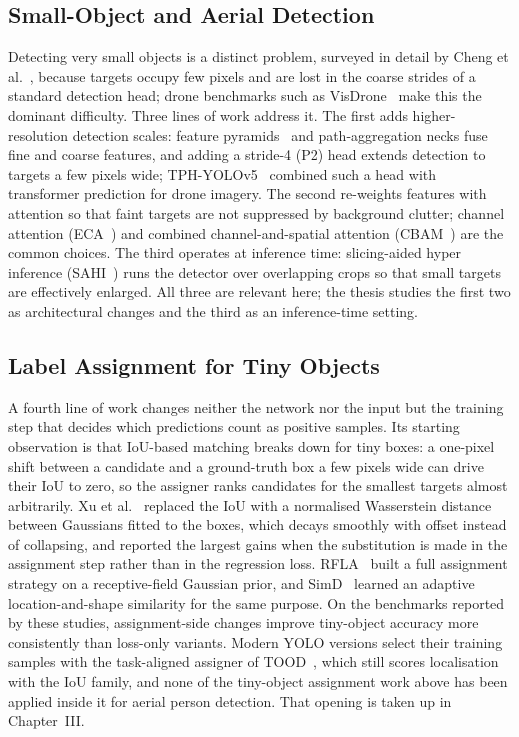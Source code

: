 \subsection{Small-Object and Aerial Detection}
Detecting very small objects is a distinct problem, surveyed in detail by Cheng et
al.~\cite{cheng2023smallobject}, because targets occupy few pixels and are lost in
the coarse strides of a standard detection head; drone benchmarks such as
VisDrone~\cite{zhu2021visdrone} make this the dominant difficulty. Three lines of
work address it. The first adds higher-resolution detection scales: feature
pyramids~\cite{lin2017fpn} and path-aggregation necks fuse fine and coarse features,
and adding a stride-4 (P2) head extends detection to targets a few pixels wide;
TPH-YOLOv5~\cite{zhu2021tphyolov5} combined such a head with transformer prediction
for drone imagery. The second re-weights features with attention so that faint
targets are not suppressed by background clutter; channel attention
(ECA~\cite{wang2020eca}) and combined channel-and-spatial attention
(CBAM~\cite{woo2018cbam}) are the common choices. The third operates at inference
time: slicing-aided hyper inference (SAHI~\cite{akyon2022sahi}) runs the detector
over overlapping crops so that small targets are effectively enlarged. All three are
relevant here; the thesis studies the first two as architectural changes and the
third as an inference-time setting.

\subsection{Label Assignment for Tiny Objects}
A fourth line of work changes neither the network nor the input but the
training step that decides which predictions count as positive samples. Its
starting observation is that IoU-based matching breaks down for tiny boxes: a
one-pixel shift between a candidate and a ground-truth box a few pixels wide
can drive their IoU to zero, so the assigner ranks candidates for the smallest
targets almost arbitrarily. Xu et al.~\cite{xu2022nwdrka} replaced the IoU
with a normalised Wasserstein distance between Gaussians fitted to the boxes,
which decays smoothly with offset instead of collapsing, and reported the
largest gains when the substitution is made in the assignment step rather than
in the regression loss. RFLA~\cite{xu2022rfla} built a full assignment strategy
on a receptive-field Gaussian prior, and SimD~\cite{shi2024simd} learned an
adaptive location-and-shape similarity for the same purpose. On the benchmarks
reported by these studies, assignment-side changes improve tiny-object accuracy
more consistently than loss-only variants. Modern YOLO
versions select their training samples with the task-aligned assigner of
TOOD~\cite{feng2021tood}, which still scores localisation with the IoU family,
and none of the tiny-object assignment work above has been applied inside it
for aerial person detection. That opening is taken up in Chapter~III.

